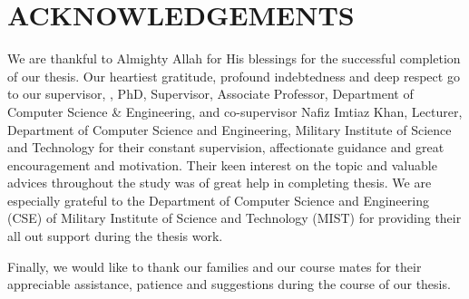 
\chapter{ACKNOWLEDGEMENTS}

\justifying
We are thankful to Almighty Allah for His blessings for the successful
completion of our thesis. Our heartiest gratitude, profound indebtedness and deep respect go to our supervisor, {\def\supdel{, }\thesupervisor}, PhD, Supervisor, Associate Professor, Department of Computer Science & Engineering, and co-supervisor Nafiz Imtiaz Khan, Lecturer, Department of Computer Science and Engineering, Military Institute of Science and Technology
for their constant supervision, affectionate guidance and great encouragement and motivation. Their keen interest on the topic and valuable advices throughout the study was of great help in completing thesis. We are especially grateful to the Department of Computer Science and
Engineering (CSE) of Military Institute of Science and Technology (MIST) for providing their all out support during the thesis work.



Finally, we would like to thank our families and our course mates for
their appreciable assistance, patience and suggestions during the
course of our thesis.
%
%
%


 






\vfill
